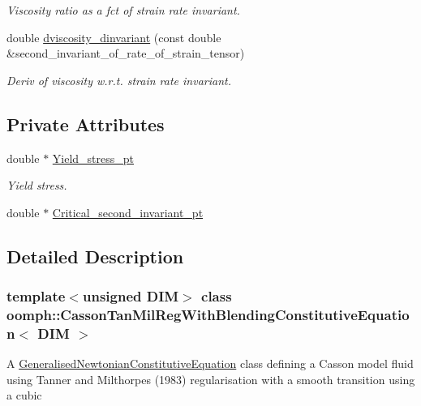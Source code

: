 \begin{DoxyCompactItemize}
\begin{DoxyCompactList}\small\item\em Viscosity ratio as a fct of strain rate invariant. \end{DoxyCompactList}\item 
double \hyperlink{classoomph_1_1CassonTanMilRegWithBlendingConstitutiveEquation_addb110a4246eb4e7bdcef5d017123911}{dviscosity\+\_\+dinvariant} (const double \&second\+\_\+invariant\+\_\+of\+\_\+rate\+\_\+of\+\_\+strain\+\_\+tensor)
\begin{DoxyCompactList}\small\item\em Deriv of viscosity w.\+r.\+t. strain rate invariant. \end{DoxyCompactList}\end{DoxyCompactItemize}
\subsection*{Private Attributes}
\begin{DoxyCompactItemize}
\item 
double $\ast$ \hyperlink{classoomph_1_1CassonTanMilRegWithBlendingConstitutiveEquation_a17aa5fc2eaaacf3eb7176c6f5a5a165b}{Yield\+\_\+stress\+\_\+pt}
\begin{DoxyCompactList}\small\item\em Yield stress. \end{DoxyCompactList}\item 
double $\ast$ \hyperlink{classoomph_1_1CassonTanMilRegWithBlendingConstitutiveEquation_ac003ae43c6171c85d3e75d0825f20cc9}{Critical\+\_\+second\+\_\+invariant\+\_\+pt}
\end{DoxyCompactItemize}


\subsection{Detailed Description}
\subsubsection*{template$<$unsigned D\+IM$>$\newline
class oomph\+::\+Casson\+Tan\+Mil\+Reg\+With\+Blending\+Constitutive\+Equation$<$ D\+I\+M $>$}

A \hyperlink{classoomph_1_1GeneralisedNewtonianConstitutiveEquation}{Generalised\+Newtonian\+Constitutive\+Equation} class defining a Casson model fluid using Tanner and Milthorpe\textquotesingle{}s (1983) regularisation with a smooth transition using a cubic 

